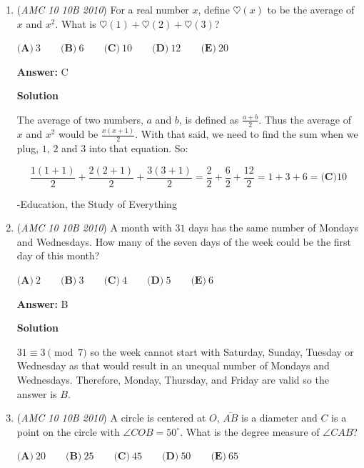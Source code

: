 \begin{enumerate}
 -Education, the Study of Everything

 


	\item (\textit{AMC 10 10B 2010}) For a real number $x$, define $\heartsuit(x)$ to be the average of $x$ and $x^2$. What is $\heartsuit(1)+\heartsuit(2)+\heartsuit(3)$?


 $\textbf{(A)}\ 3 \qquad \textbf{(B)}\ 6 \qquad \textbf{(C)}\ 10 \qquad \textbf{(D)}\ 12 \qquad \textbf{(E)}\ 20$

 \textbf{Answer: }C



\textbf{Solution}

The average of two numbers, $a$ and $b$, is defined as $\frac{a+b}{2}$. Thus the average of $x$ and $x^2$ would be $\frac{x(x+1)}{2}$. With that said,  we need to find the sum when we plug, $1$, $2$ and $3$ into that equation. So:

 

 \[\frac{1(1+1)}{2} + \frac{2(2+1)}{2} + \frac{3(3+1)}{2} = \frac{2}{2} + \frac{6}{2} + \frac{12}{2} = 1+3+6= \boxed{\textbf{(C)} 10}\]

 -Education, the Study of Everything

 


	\item (\textit{AMC 10 10B 2010}) A month with $31$ days has the same number of Mondays and Wednesdays. How many of the seven days of the week could be the first day of this month?


 $\textbf{(A)}\ 2 \qquad \textbf{(B)}\ 3 \qquad \textbf{(C)}\ 4 \qquad \textbf{(D)}\ 5 \qquad \textbf{(E)}\ 6$

 \textbf{Answer: }B



\textbf{Solution}

$31 \equiv 3 \pmod {7}$ so the week cannot start with Saturday, Sunday, Tuesday or Wednesday as that would result in an unequal number of Mondays and Wednesdays. Therefore, Monday, Thursday, and Friday are valid so the answer is $\boxed{B}$.

 


	\item (\textit{AMC 10 10B 2010}) A circle is centered at $O$, $\overline{AB}$ is a diameter and $C$ is a point on the circle with $\angle COB = 50^\circ$.
What is the degree measure of $\angle CAB$?


 $\textbf{(A)}\ 20 \qquad \textbf{(B)}\ 25 \qquad \textbf{(C)}\ 45 \qquad \textbf{(D)}\ 50 \qquad \textbf{(E)}\ 65$


\end{enumerate}
